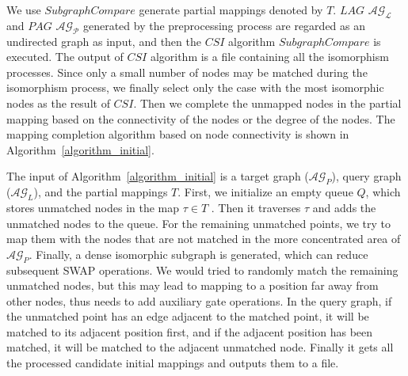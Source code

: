 \documentclass[runningheads]{llncs}
\begin{document}
We use $SubgraphCompare$ generate partial mappings denoted by $T$. 
$LAG$ $\mathcal{AG_{L}}$ 
and $PAG$ $\mathcal{AG_{P}}$ generated by the preprocessing process 
are regarded as an undirected graph as input, and then the $CSI$ algorithm $SubgraphCompare$ is executed. 
The output of $CSI$ algorithm is a file containing all the isomorphism processes.
Since only a small number of nodes may be matched during the isomorphism process, we finally select only the case 
with the most isomorphic nodes as the result of $CSI$.
Then we complete the unmapped nodes in the partial mapping based on the connectivity of 
the nodes or the degree of the nodes. 
The mapping completion algorithm based on node connectivity is shown in Algorithm~\ref{algorithm_initial}.

The input of Algorithm~\ref{algorithm_initial} is a target graph ($\mathcal{AG}_{P}$), 
query graph ($\mathcal{AG}_{L}$), and the partial mappings $T$.
First, we initialize an empty queue $Q$, which stores unmatched nodes in the map $\tau \in T$ .
Then it traverses $\tau$ and adds the unmatched nodes to the queue. 
For the remaining unmatched points, we try to map them with the nodes that are not 
matched in the more concentrated area of $\mathcal{AG}_{P}$.
Finally, a dense isomorphic subgraph is generated, which can reduce subsequent SWAP operations.
We would tried to randomly match the remaining unmatched nodes, 
but this may lead to mapping to a position far away from other nodes, 
thus needs to add auxiliary gate operations.
In the query graph, if the unmatched point has an edge adjacent to the matched point, 
it will be matched to its adjacent position first, 
and if the adjacent position has been matched, 
it will be matched to the adjacent unmatched node.
Finally it gets all the processed candidate initial mappings and outputs them to a file.
\end{document}
